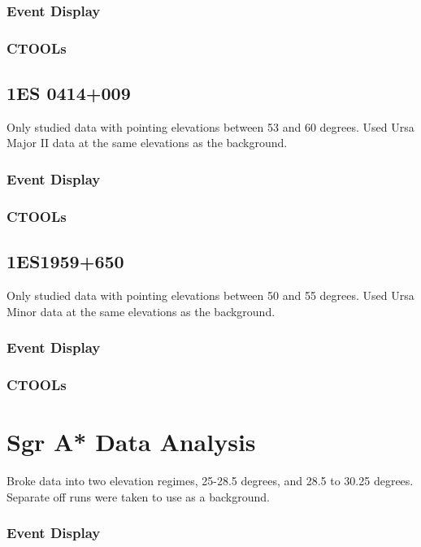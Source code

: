     \subsubsection{Event Display}
    \subsubsection{CTOOLs}

  \subsection{1ES 0414+009}
    Only studied data with pointing elevations between 53 and 60 degrees.
    Used Ursa Major II data at the same elevations as the background.

    \subsubsection{Event Display}
    \subsubsection{CTOOLs}

  \subsection{1ES1959+650}
    Only studied data with pointing elevations between 50 and 55 degrees.
    Used Ursa Minor data at the same elevations as the background.

    \subsubsection{Event Display}
    \subsubsection{CTOOLs}

\section{Sgr A* Data Analysis}
Broke data into two elevation regimes, 25-28.5 degrees, and 28.5 to 30.25 degrees.
Separate off runs were taken to use as a background.

  \subsubsection{Event Display}


